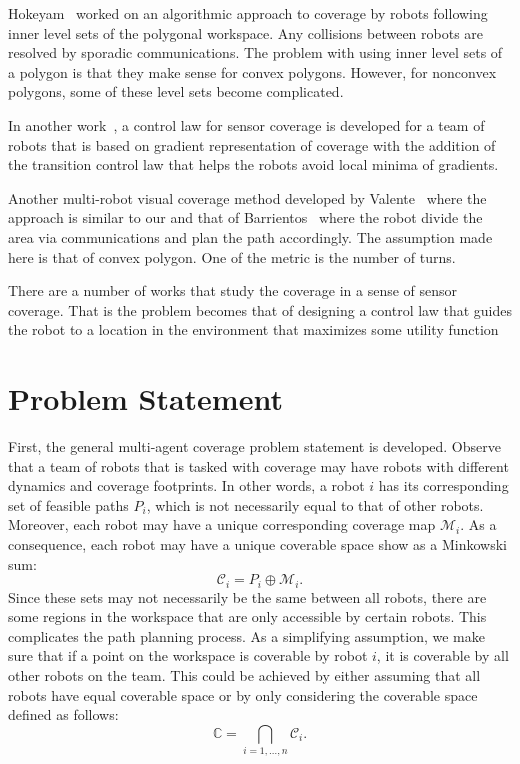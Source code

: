 \documentclass[../main.tex]{subfiles}
\begin{document}
Hokeyam~\cite{hokayem2007dynamic} worked on an algorithmic approach to coverage by robots following inner level sets of the polygonal workspace. Any collisions between robots are resolved by sporadic communications. The problem with using inner level sets of a polygon is that they make sense for convex polygons. However, for nonconvex polygons, some of these level sets become complicated. 

In another work~\cite{atincc2013supervised}, a control law for sensor coverage is developed for a team of robots that is based on gradient representation of coverage with the addition of the transition control law that helps the robots avoid local minima of gradients.

Another multi-robot visual coverage method developed by Valente~\cite{valente2011multi} where the approach is similar to our and that of Barrientos~\cite{barrientos2011aerial} where the robot divide the area via communications and plan the path accordingly. The assumption made here is that of convex polygon. One of the metric is the number of turns.

There are a number of works that study the coverage in a sense of sensor coverage. That is the problem becomes that of designing a control law that guides the robot to a location in the environment that maximizes some utility function%


\section{Problem Statement}
\label{sec:multi_problem_statement}

First, the general multi-agent coverage problem statement is developed. Observe that a team of robots that is tasked with coverage may have robots with different dynamics and coverage footprints. In other words, a robot $i$ has its corresponding set of feasible paths $P_i$, which is not necessarily equal to that of other robots. Moreover, each robot may have a unique corresponding coverage map $\mathcal{M}_i$. As a consequence, each robot may have a unique coverable space show as a Minkowski sum:
\begin{equation}
	\mathcal{C}_i=P_i\oplus \mathcal{M}_i.
\end{equation}
Since these sets may not necessarily be the same between all robots, there are some regions in the workspace that are only accessible by certain robots. This complicates the path planning process. As a simplifying assumption, we make sure that if a point on the workspace is coverable by robot $i$, it is coverable by all other robots on the team. This could be achieved by either assuming that all robots have equal coverable space or by only considering the coverable space defined as follows:
\begin{equation}
	\mathbb{C}=\bigcap_{i=1,\ldots,n}\mathcal{C}_i.
\end{equation}
\end{document}
